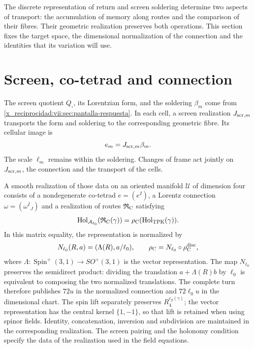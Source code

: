 The discrete representation of return and screen soldering
determine two aspects of transport: the accumulation of memory along
routes and the comparison of their fibres. Their geometric realization
preserves both operations. This section fixes the target
space, the dimensional normalization of the connection and the identities
that its variation will use.

\section{Screen, co-tetrad and connection}

The screen quotient \(Q_\square\), its Lorentzian form, and the
soldering \(\beta_m\) come from
\ref{x_reciprocidad:vii:sec:pantalla-respuesta}. In each cell, a screen realization
\(J_{{\rm scr},m}\) transports the form and soldering to the
corresponding geometric fibre. Its cellular image is
\[
 e_m=J_{{\rm scr},m}\beta_m.
\]
The scale \(\ell_m\) remains within the soldering. Changes
of frame act jointly on \(J_{{\rm scr},m}\), the connection
and the transport of the cells.

A smooth realization of those data on an oriented manifold
\(\mathcal U\) of dimension four consists of a nondegenerate
co-tetrad \(e=(e^I)\), a Lorentz connection
\(\omega=(\omega^I{}_J)\) and a realization of routes
\(\mathfrak R_{\rm C}\) satisfying
\begin{equation}
 \operatorname{Hol}_{\mathcal A_{\ell_0}}
       (\mathfrak R_{\rm C}(\gamma))
 =\rho_{\rm C}(\operatorname{Hol}_{\rm TPK}(\gamma)).
 \label{x_reciprocidad:vii:eq:compatibilidad-holonomia-geometrica}
\end{equation}
In this matrix equality, the representation is normalized by
\[
 N_{\ell_0}(R,a)=(\Lambda(R),a/\ell_0),\qquad
 \rho_{\rm C}=N_{\ell_0}\circ\rho_{\rm C}^{\rm disc},
\]
where \(\Lambda:\operatorname{Spin}^+(3,1)\to SO^+(3,1)\)
is the vector representation. The map \(N_{\ell_0}\)
preserves the semidirect product: dividing the translation
\(a+\Lambda(R)b\) by \(\ell_0\) is equivalent to composing the
two normalized translations. The complete turn therefore publishes
\(72u\) in the normalized connection and \(72\ell_0u\) in the
dimensional chart. The spin lift separately preserves
\(R_4^{c_g(\gamma)}\); the vector representation has the
central kernel \(\{1,-1\}\), so that lift is retained
when using spinor fields.
Identity, concatenation, inversion and subdivision are maintained in the
corresponding realization. The screen pairing
and the holonomy condition specify the data of the
realization used in the field equations.

